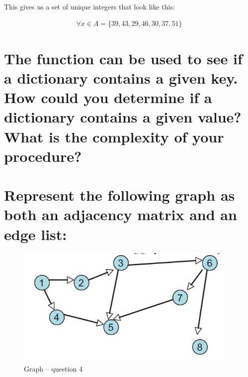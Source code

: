 \documentclass[letter,11pt]{scrartcl}
\begin{document}
This gives us a set of unique integers that look like this:

\begin{align*}
  \forall x \in A = \lbrace 39, 43, 29, 46, 30, 37, 51 \rbrace
\end{align*}


\section[question_3]{The function  can be used to see if a
  dictionary contains a given key. How could you determine if a dictionary
  contains a given value? What is the complexity of your procedure?}




\section[question_4]{Represent the following graph as both an adjacency matrix
  and an edge list:}

\begin{figure}[H]
  \centering
  \includegraphics[width=0.95\textwidth]{graph}
  \caption{Graph -- question 4}
\end{figure}
\end{document}
